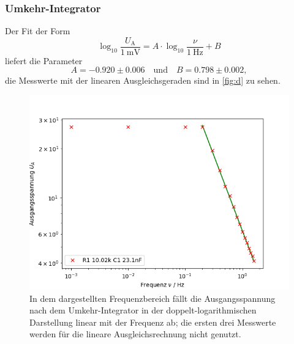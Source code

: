 \subsubsection{Umkehr-Integrator}

Der Fit der Form
\begin{equation}
	\log_{10} \frac{U_\text{A}}{\SI{1}{\milli\volt}} = A \cdot \log_{10} \frac{\nu}{\SI{1}{\hertz}} + B
\end{equation}
liefert die Parameter
\begin{equation}
	A = -0.920 \pm 0.006 \quad \text{und} \quad B = 0.798 \pm 0.002,
\end{equation}
die Messwerte mit der linearen Ausgleichsgeraden sind in \autoref{fig:d} zu sehen.
\begin{figure}[h]
	\centering
	\includegraphics[width=\textwidth]{img/d.png}
	\caption{In dem dargestellten Frequenzbereich fällt die Ausgangsspannung nach dem Umkehr-Integrator in der doppelt-logarithmischen Darstellung linear mit der Frequenz ab; die ersten drei Messwerte werden für die lineare Ausgleichsrechnung nicht genutzt.}
	\label{fig:d}
\end{figure}

